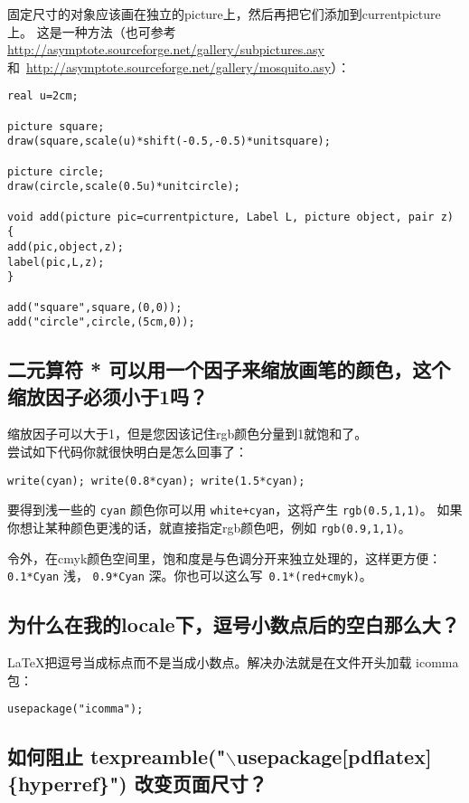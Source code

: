 固定尺寸的对象应该画在独立的picture上，然后再把它们添加到currentpicture上。
这是一种方法（也可参考~\url{ http://asymptote.sourceforge.net/gallery/subpictures.asy}
和~\url{http://asymptote.sourceforge.net/gallery/mosquito.asy}）：

\begin{lstlisting}
real u=2cm;
 
picture square;
draw(square,scale(u)*shift(-0.5,-0.5)*unitsquare);
 
picture circle;
draw(circle,scale(0.5u)*unitcircle);
 
void add(picture pic=currentpicture, Label L, picture object, pair z) { 
add(pic,object,z);
label(pic,L,z);
} 
 
add("square",square,(0,0));
add("circle",circle,(5cm,0));
\end{lstlisting}

\subsection{\label{Q4.10}二元算符 * 可以用一个因子来缩放画笔的颜色，这个缩放因子必须小于1吗？}

缩放因子可以大于1，但是您因该记住rgb颜色分量到1就饱和了。\\
尝试如下代码你就很快明白是怎么回事了：
\begin{lstlisting}
write(cyan); write(0.8*cyan); write(1.5*cyan);
\end{lstlisting}
要得到浅一些的 \verb|cyan| 颜色你可以用 \verb|white+cyan|，这将产生 \verb|rgb(0.5,1,1)|。
如果你想让某种颜色更浅的话，就直接指定rgb颜色吧，例如 \verb|rgb(0.9,1,1)|。

令外，在cmyk颜色空间里，饱和度是与色调分开来独立处理的，这样更方便：
\verb|0.1*Cyan| 浅， \verb|0.9*Cyan| 深。你也可以这么写~\verb|0.1*(red+cmyk)|。


\subsection{\label{Q4.11}为什么在我的locale下，逗号小数点后的空白那么大？}

LaTeX把逗号当成标点而不是当成小数点。解决办法就是在文件开头加载 icomma 包：
\begin{lstlisting}
usepackage("icomma");
\end{lstlisting}

\subsection{\label{Q4.12}如何阻止 texpreamble("$\backslash$usepackage[pdflatex]\{hyperref\}") 改变页面尺寸？}

